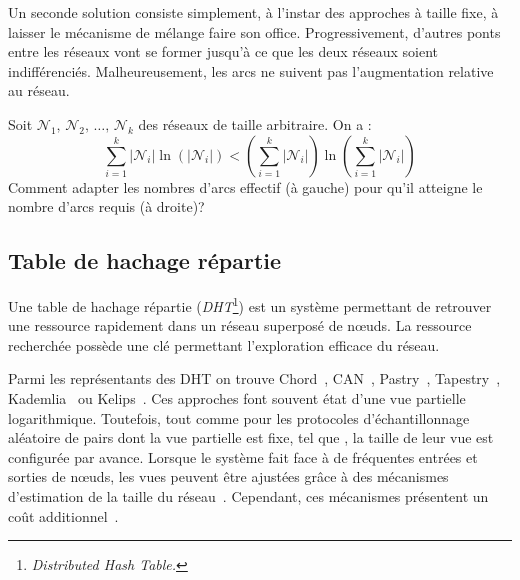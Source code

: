 \noindent Un seconde solution consiste simplement, à l'instar des approches à
taille fixe, à laisser le mécanisme de mélange faire son office. Progressivement,
d'autres ponts entre les réseaux vont se former jusqu'à ce que les deux réseaux
soient indifférenciés. Malheureusement, les arcs ne suivent pas l'augmentation
relative au réseau.

\begin{problem}
  Soit $\mathcal{N}_1,\, \mathcal{N}_2,\, \ldots ,\, \mathcal{N}_k$ des réseaux
  de taille arbitraire. On a : \vspace{-5pt}
\begin{equation}
  \sum\limits_{i = 1}^k |\mathcal{N}_i|\ln (|\mathcal{N}_i|) < (\sum\limits_{i = 1}^k |\mathcal{N}_i|)\ln{(\sum\limits_{i=1}^k |\mathcal{N}_i|)}
\end{equation}
Comment adapter les nombres d'arcs effectif (à gauche) pour qu'il atteigne le
nombre d'arcs requis (à droite)?
\end{problem}



\subsection{Table de hachage répartie}

Une table de hachage répartie (\emph{DHT}\footnote{\emph{Distributed Hash
    Table.}}) est un système permettant de retrouver une ressource rapidement
dans un réseau superposé de nœuds. La ressource recherchée possède une clé
permettant l'exploration efficace du réseau.

Parmi les représentants des DHT on trouve Chord~\cite{stoica2001chord},
CAN~\cite{ratnasamy2001scalable}, Pastry~\cite{rowstron2001pastry},
Tapestry~\cite{zhao2006tapestry}, Kademlia~\cite{maymounkov2002kademlia} ou
Kelips~\cite{gupta2003kelips}.  Ces approches font souvent état d'une vue
partielle logarithmique.  Toutefois, tout comme pour les protocoles
d'échantillonnage aléatoire de pairs dont la vue partielle est fixe, tel que
\CYCLON, la taille de leur vue est configurée par avance. Lorsque le système
fait face à de fréquentes entrées et sorties de nœuds, les vues peuvent être
ajustées grâce à des mécanismes d'estimation de la taille du
réseau~\cite{camarillo2014self, ghinita2006adaptive}. Cependant, ces mécanismes
présentent un coût additionnel~\cite{ghinita2006adaptive}.

